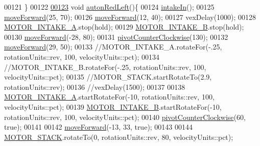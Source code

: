 \begin{DoxyCode}
00121 \}
00122 
\mbox{\hyperlink{auton_8cpp_aae46c4423bc7ed2947e82c4c5dd7f469_aae46c4423bc7ed2947e82c4c5dd7f469}{00123}} \textcolor{keywordtype}{void} \mbox{\hyperlink{auton_8cpp_aae46c4423bc7ed2947e82c4c5dd7f469_aae46c4423bc7ed2947e82c4c5dd7f469}{autonRedLeft}}()\{
00124   \mbox{\hyperlink{drive_8h_aa0846c73538fc48569a7c7c3689a59f0_aa0846c73538fc48569a7c7c3689a59f0}{intakeIn}}();
00125   \mbox{\hyperlink{auton_8cpp_af5833bec4b862d3da7fc3700ca7d2a6b_af5833bec4b862d3da7fc3700ca7d2a6b}{moveForward}}(25, 70);
00126   \mbox{\hyperlink{auton_8cpp_af5833bec4b862d3da7fc3700ca7d2a6b_af5833bec4b862d3da7fc3700ca7d2a6b}{moveForward}}(12, 40);
00127   vexDelay(1000);
00128   \mbox{\hyperlink{declarations_8h_a34de211d15bfb3c0ac450597fd96b4fc_a34de211d15bfb3c0ac450597fd96b4fc}{MOTOR\_INTAKE\_A}}.stop(hold);
00129   \mbox{\hyperlink{declarations_8h_a5ae79e7ed71b0b94b3983c22c60c2eaa_a5ae79e7ed71b0b94b3983c22c60c2eaa}{MOTOR\_INTAKE\_B}}.stop(hold);
00130   \mbox{\hyperlink{auton_8cpp_af5833bec4b862d3da7fc3700ca7d2a6b_af5833bec4b862d3da7fc3700ca7d2a6b}{moveForward}}(-28, 80);
00131   \mbox{\hyperlink{auton_8cpp_a241030fa952d5f1fdbe92a97a20e6a36_a241030fa952d5f1fdbe92a97a20e6a36}{pivotCounterClockwise}}(130);
00132   \mbox{\hyperlink{auton_8cpp_af5833bec4b862d3da7fc3700ca7d2a6b_af5833bec4b862d3da7fc3700ca7d2a6b}{moveForward}}(29, 50);
00133   \textcolor{comment}{//MOTOR\_INTAKE\_A.rotateFor(-.25, rotationUnits::rev, 100, velocityUnits::pct);}
00134   \textcolor{comment}{//MOTOR\_INTAKE\_B.rotateFor(-.25, rotationUnits::rev, 100, velocityUnits::pct);}
00135   \textcolor{comment}{//MOTOR\_STACK.startRotateTo(2.9, rotationUnits::rev);}
00136   \textcolor{comment}{//vexDelay(1500);}
00137   
00138   \mbox{\hyperlink{declarations_8h_a34de211d15bfb3c0ac450597fd96b4fc_a34de211d15bfb3c0ac450597fd96b4fc}{MOTOR\_INTAKE\_A}}.startRotateFor(-10, rotationUnits::rev, 100, velocityUnits::pct);
00139   \mbox{\hyperlink{declarations_8h_a5ae79e7ed71b0b94b3983c22c60c2eaa_a5ae79e7ed71b0b94b3983c22c60c2eaa}{MOTOR\_INTAKE\_B}}.startRotateFor(-10, rotationUnits::rev, 100, velocityUnits::pct);
00140   \mbox{\hyperlink{auton_8cpp_a241030fa952d5f1fdbe92a97a20e6a36_a241030fa952d5f1fdbe92a97a20e6a36}{pivotCounterClockwise}}(60, \textcolor{keyword}{true});
00141   
00142   \mbox{\hyperlink{auton_8cpp_af5833bec4b862d3da7fc3700ca7d2a6b_af5833bec4b862d3da7fc3700ca7d2a6b}{moveForward}}(-13, 33, \textcolor{keyword}{true});
00143   
00144   \mbox{\hyperlink{declarations_8h_a212c888d64ffcd7e7b44a548fa0408a9_a212c888d64ffcd7e7b44a548fa0408a9}{MOTOR\_STACK}}.rotateTo(0, rotationUnits::rev, 80, velocityUnits::pct);

\end{DoxyCode}
